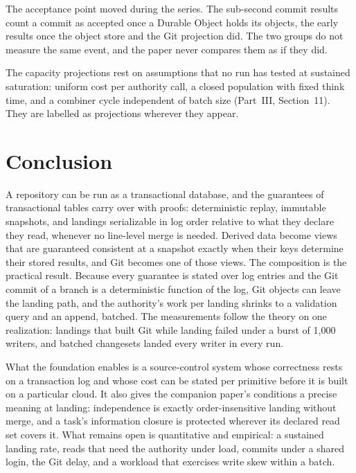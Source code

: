 \documentclass[11pt,letterpaper]{article}
\theoremstyle{definition}
\theoremstyle{remark}
\begin{document}
The acceptance point moved during the series. The sub-second commit results count a commit as accepted once a Durable Object holds its objects, the early results once the object store and the Git projection did. The two groups do not measure the same event, and the paper never compares them as if they did.

The capacity projections rest on assumptions that no run has tested at sustained saturation: uniform cost per authority call, a closed population with fixed think time, and a combiner cycle independent of batch size (Part~III, Section~11). They are labelled as projections wherever they appear.

\section{Conclusion}
\label{sec:syn:conclusion}

A repository can be run as a transactional database, and the guarantees of transactional tables carry over with proofs: deterministic replay, immutable snapshots, and landings serializable in log order relative to what they declare they read, whenever no line-level merge is needed. Derived data become views that are guaranteed consistent at a snapshot exactly when their keys determine their stored results, and Git becomes one of those views. The composition is the practical result. Because every guarantee is stated over log entries and the Git commit of a branch is a deterministic function of the log, Git objects can leave the landing path, and the authority's work per landing shrinks to a validation query and an append, batched. The measurements follow the theory on one realization: landings that built Git while landing failed under a burst of 1,000 writers, and batched changesets landed every writer in every run.

What the foundation enables is a source-control system whose correctness rests on a transaction log and whose cost can be stated per primitive before it is built on a particular cloud. It also gives the companion paper's conditions a precise meaning at landing: independence is exactly order-insensitive landing without merge, and a task's information closure is protected wherever its declared read set covers it. What remains open is quantitative and empirical: a sustained landing rate, reads that need the authority under load, commits under a shared login, the Git delay, and a workload that exercises write skew within a batch.
\end{document}
